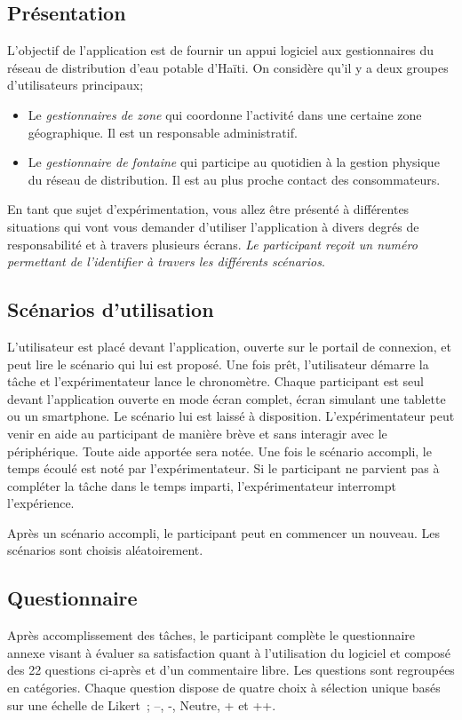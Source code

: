 \documentclass[a4paper, 11pt]{article}
\begin{document}
    \subsection*{Présentation}
        L'objectif de l'application est de fournir un appui logiciel aux gestionnaires du réseau de distribution d'eau potable d'Haïti. On considère qu'il y a deux groupes d'utilisateurs principaux;
        \begin{itemize}
            \item Le \emph{gestionnaires de zone} qui coordonne l'activité dans une certaine zone géographique. Il est un responsable administratif.
            \item Le \emph{gestionnaire de fontaine} qui participe au quotidien à la gestion physique du réseau de distribution. Il est au plus proche contact des consommateurs.
        \end{itemize}
        En tant que sujet d'expérimentation, vous allez être présenté à différentes situations qui vont vous demander d'utiliser l'application à divers degrés de responsabilité et à travers plusieurs écrans. \emph{Le participant reçoit un numéro permettant de l'identifier à travers les différents scénarios}.

    \subsection*{Scénarios d'utilisation}
        L'utilisateur est placé devant l'application, ouverte sur le portail de connexion, et peut lire le scénario qui lui est proposé. Une fois prêt, l'utilisateur démarre la tâche et l'expérimentateur lance le chronomètre. Chaque participant est seul devant l'application ouverte en mode écran complet, écran simulant une tablette ou un smartphone. Le scénario lui est laissé à disposition. L'expérimentateur peut venir en aide au participant de manière brève et sans interagir avec le périphérique. Toute aide apportée sera notée. Une fois le scénario accompli, le temps écoulé est noté par l'expérimentateur. Si le participant ne parvient pas à compléter la tâche dans le temps imparti, l'expérimentateur interrompt l'expérience.

        Après un scénario accompli, le participant peut en commencer un nouveau. Les scénarios sont choisis aléatoirement.

    \subsection*{Questionnaire}
        Après accomplissement des tâches, le participant complète le questionnaire annexe visant à évaluer sa satisfaction quant à l'utilisation du logiciel et composé des 22 questions ci-après et d'un commentaire libre. Les questions sont regroupées en catégories. Chaque question dispose
        de quatre choix à sélection unique basés sur une échelle de Likert~\cite{wikipediaLikertScale}; --, -, Neutre, + et ++.
\end{document}
